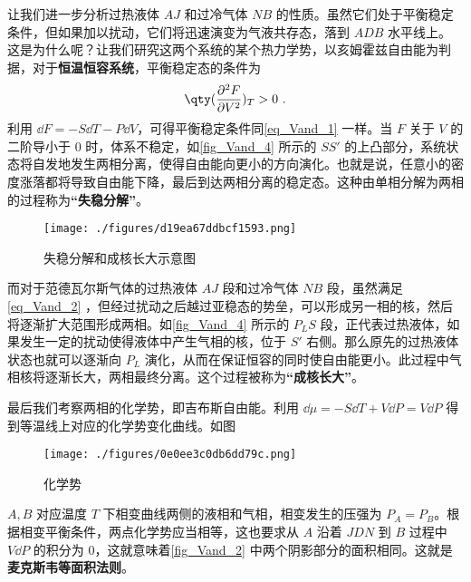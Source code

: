 让我们进一步分析过热液体 $AJ$ 和过冷气体 $NB$ 的性质。虽然它们处于平衡稳定条件，但如果加以扰动，它们将迅速演变为气液共存态，落到 $ADB$ 水平线上。这是为什么呢？让我们研究这两个系统的某个热力学势，以亥姆霍兹自由能为判据，对于\textbf{恒温恒容系统}，平衡稳定态的条件为
\begin{equation}\label{eq_Vand_2}
\qty(\frac{\partial^2 F}{\partial V^2})_T>0~.
\end{equation}
利用 $\dd F=-S\dd T-P\dd V$，可得平衡稳定条件同\autoref{eq_Vand_1} 一样。当 $F$ 关于 $V$ 的二阶导小于 $0$ 时，体系不稳定，如\autoref{fig_Vand_4} 所示的 $SS'$ 的上凸部分，系统状态将自发地发生两相分离，使得自由能向更小的方向演化。也就是说，任意小的密度涨落都将导致自由能下降，最后到达两相分离的稳定态。这种由单相分解为两相的过程称为\textbf{“失稳分解”}。
\begin{figure}[ht]
\centering
\texttt{[image: ./figures/d19ea67ddbcf1593.png]}
\caption{失稳分解和成核长大示意图} \label{fig_Vand_4}
\end{figure}
而对于范德瓦尔斯气体的过热液体 $AJ$ 段和过冷气体 $NB$ 段，虽然满足\autoref{eq_Vand_2} ，但经过扰动之后越过亚稳态的势垒，可以形成另一相的核，然后将逐渐扩大范围形成两相。如\autoref{fig_Vand_4} 所示的 $P_LS$ 段，正代表过热液体，如果发生一定的扰动使得液体中产生气相的核，位于 $S'$ 右侧。那么原先的过热液体状态也就可以逐渐向 $P_L$ 演化，从而在保证恒容的同时使自由能更小。此过程中气相核将逐渐长大，两相最终分离。这个过程被称为\textbf{“成核长大”}。



最后我们考察两相的化学势，即吉布斯自由能。利用 $\dd \mu=-S\dd T+V\dd P=V\dd P$ 得到等温线上对应的化学势变化曲线。如图

\begin{figure}[ht]
\centering
\texttt{[image: ./figures/0e0ee3c0db6dd79c.png]}
\caption{化学势} \label{fig_Vand_3}
\end{figure}
$A,B$ 对应温度 $T$ 下相变曲线两侧的液相和气相，相变发生的压强为 $P_A=P_B$。根据相变平衡条件，两点化学势应当相等，这也要求从 $A$ 沿着 $JDN$ 到 $B$ 过程中 $V\dd P$ 的积分为 $0$，这就意味着\autoref{fig_Vand_2} 中两个阴影部分的面积相同。这就是\textbf{麦克斯韦等面积法则}。